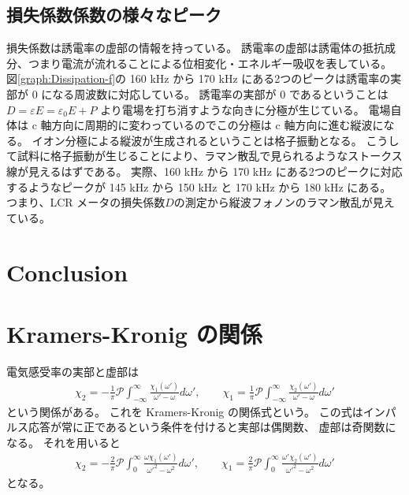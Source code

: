 \documentclass[9pt,dvipdfmx,a4paper]{jsarticle}
\begin{document}
\subsection{損失係数係数の様々なピーク}
損失係数は誘電率の虚部の情報を持っている。
誘電率の虚部は誘電体の抵抗成分、つまり電流が流れることによる位相変化・エネルギー吸収を表している。
図\ref{graph:Dissipation-f}の 160 kHz から 170 kHz にある2つのピークは誘電率の実部が 0 になる周波数に対応している。
誘電率の実部が 0 であるということは\(D = \varepsilon E = \varepsilon_0 E + P\)
より電場を打ち消すような向きに分極が生じている。
電場自体は c 軸方向に周期的に変わっているのでこの分極は c 軸方向に進む縦波になる。
イオン分極による縦波が生成されるということは格子振動となる。
こうして試料に格子振動が生じることにより、ラマン散乱で見られるようなストークス線が見えるはずである。
実際、160 kHz から 170 kHz にある2つのピークに対応するようなピークが 145 kHz から 150 kHz と 170 kHz から 180 kHz にある。
つまり、LCR メータの損失係数\(D\)の測定から縦波フォノンのラマン散乱が見えている。

\subsection{}

\section{Conclusion}



\nocite{*}

\appendix
\section{Kramers-Kronig の関係}
電気感受率の実部と虚部は
\begin{align}
    \chi_2 = -\frac{1}{\pi}\mathcal{P}\int_{-\infty}^{\infty} \frac{\chi_1(\omega')}{\omega'-\omega} d\omega',\qquad
    \chi_1 =  \frac{1}{\pi}\mathcal{P}\int_{-\infty}^{\infty} \frac{\chi_2(\omega')}{\omega'-\omega} d\omega'
\end{align}
という関係がある。
これを Kramers-Kronig の関係式という。
この式はインパルス応答が常に正であるという条件を付けると実部は偶関数、
虚部は奇関数になる。
それを用いると
\begin{align}
    \chi_2 = -\frac{2}{\pi}\mathcal{P}\int_{0}^{\infty} \frac{\omega \chi_1(\omega')}{\omega'^2-\omega^2} d\omega',\qquad
    \chi_1 =  \frac{2}{\pi}\mathcal{P}\int_{0}^{\infty} \frac{\omega'\chi_2(\omega')}{\omega'^2-\omega^2} d\omega'
\end{align}
となる。
\end{document}
